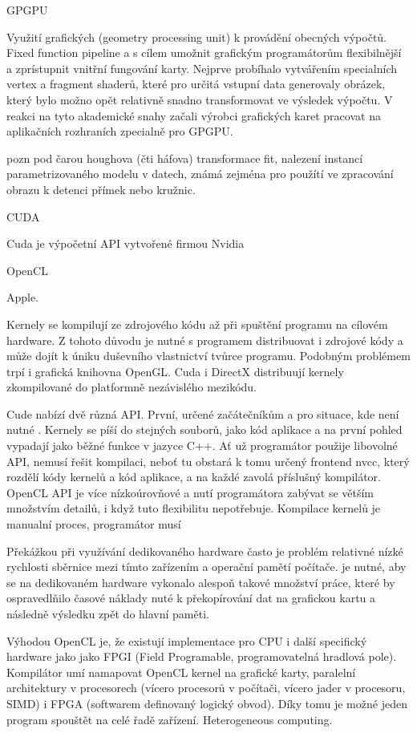 GPGPU

Využití grafických (geometry processing unit) k provádění obecných výpočtů. Fixed function pipeline a s cílem umožnit grafickým programátorům flexibilnější a zprístupnit vnitřní fungování karty. Nejprve probíhalo vytvářením specialních vertex a fragment shaderů, které pro určitá vstupní data generovaly obrázek, který bylo možno opět relativně snadno transformovat ve výsledek výpočtu. V reakci na tyto akademické snahy začali výrobci grafických karet pracovat na aplikačních rozhraních zpecialně pro GPGPU.

pozn pod čarou houghova (čti háfova) transformace fit, nalezení instancí parametrizovaného modelu v datech, známá zejména pro použítí ve zpracování obrazu k detenci přímek nebo kružnic.

CUDA

Cuda je výpočetní API vytvořené firmou Nvidia

OpenCL

Apple.

Kernely se kompilují ze zdrojového kódu až při spuštění programu na cílovém hardware. Z tohoto důvodu je nutné s programem distribuovat i zdrojové kódy a může dojít k úniku duševního vlastnictví tvůrce programu. Podobným problémem trpí i grafická knihovna OpenGL. Cuda i DirectX distribuují kernely zkompilované do platformně nezávislého mezikódu.

Cude nabízí dvě různá API. První, určené začátečníkům a pro situace, kde není nutné . Kernely se píší do stejných souborů, jako kód aplikace a na první pohled vypadají jako běžné funkce v jazyce C++. Ať už programátor použije libovolné API, nemusí řešit kompilaci, neboť tu obstará k tomu určený frontend nvcc, který rozdělí kódy kernelů a kód aplikace, a na každé zavolá příslušný kompilátor. OpenCL API je více nízkoúrovňové a nutí programátora zabývat se větším množstvím detailů, i když tuto flexibilitu nepotřebuje. Kompilace kernelů je manualní proces, programátor musí 

Překážkou při využívání dedikovaného hardware často je problém relativné nízké rychlosti sběrnice mezi tímto zařízením a operační pamětí počítače. je nutné, aby se na dedikovaném hardware vykonalo alespoň takové množství práce, které by ospravedlňilo časové náklady nuté k překopírování dat na grafickou kartu a následně výsledku zpět do hlavní paměti.

Výhodou OpenCL je, že existují implementace pro CPU i další specifický hardware jako jako FPGI (Field Programable, programovatelná hradlová pole). Kompilátor umí namapovat OpenCL kernel na grafické karty, paralelní architektury v procesorech (vícero procesorů v počítači, vícero jader v procesoru, SIMD) i FPGA (softwarem definovaný logický obvod). Díky tomu je možné jeden program spouštět na celé řadě zařízení. Heterogeneous computing.


